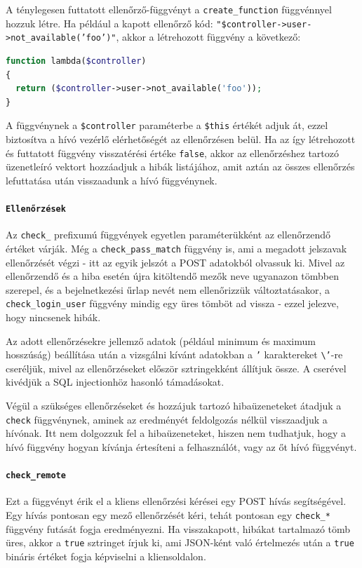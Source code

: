 \documentclass[12pt,a4paper,twoside]{article}
\begin{document}
A ténylegesen futtatott
ellenőrző-függvényt a \texttt{create\_function} függvénnyel hozzuk létre. Ha
például a kapott ellenőrző kód:
\texttt{"\$controller->user->not\_available('foo')"}, akkor a létrehozott
függvény a következő:

\begin{lstlisting}[language=PHP, numbers=none]
function lambda($controller)
{
  return ($controller->user->not_available('foo'));
}
\end{lstlisting}

A függvénynek a \texttt{\$controller} paraméterbe a \texttt{\$this} értékét
adjuk át, ezzel biztosítva a hívó vezérlő elérhetőségét az ellenőrzésen
belül. Ha az így létrehozott és futtatott függvény visszatérési értéke
\texttt{false}, akkor az ellenőrzéshez tartozó üzenetleíró vektort hozzáadjuk a
hibák listájához, amit aztán az összes ellenőrzés lefuttatása után visszaadunk a
hívó függvénynek.


\paragraph{\texttt{Ellenőrzések}}
Az \texttt{check\_} prefixumú függvények egyetlen paraméterükként az
ellenőrzendő értéket várják. Még a \texttt{check\_pass\_match} függvény is, ami
a megadott jelszavak ellenőrzését végzi - itt az egyik jelszót a POST adatokból
olvassuk ki. Mivel az ellenőrzendő és a hiba esetén újra kitöltendő mezők neve
ugyanazon tömbben szerepel, és a bejelnetkezési űrlap nevét nem ellenőrizzük
változtatásakor, a \texttt{check\_login\_user} függvény mindig egy üres tömböt
ad vissza - ezzel jelezve, hogy nincsenek hibák.

Az adott ellenőrzésekre jellemző adatok (például minimum és maximum hosszúság)
beállítása után a vizsgálni kívánt adatokban a \texttt{'} karaktereket
\texttt{\textbackslash'}-re cseréljük, mivel az ellenőrzéseket először sztringekként állítjuk
össze. A cserével kivédjük a SQL injectionhöz hasonló támadásokat.

Végül a szükséges ellenőrzéseket és hozzájuk tartozó hibaüzeneteket átadjuk a
\texttt{check} függvénynek, aminek az eredményét feldolgozás nélkül visszaadjuk
a hívónak. Itt nem dolgozzuk fel a hibaüzeneteket, hiszen nem tudhatjuk, hogy a
hívó függvény hogyan kívánja értesíteni a felhasználót, vagy az őt hívó
függvényt.


\paragraph{\texttt{check\_remote}}
Ezt a függvényt érik el a kliens ellenőrzési kérései egy POST hívás
segítségével. Egy hívás pontosan egy mező ellenőrzését kéri, tehát pontosan egy
\texttt{check\_*} függvény futását fogja eredményezni. Ha visszakapott, hibákat
tartalmazó tömb üres, akkor a \texttt{true} sztringet írjuk ki, ami JSON-ként
való értelmezés után a \texttt{true} bináris értéket fogja képviselni a
kliensoldalon.
\end{document}
